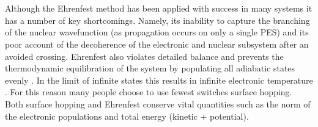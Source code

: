 \\\\
Although the Ehrenfest method has been applied with success in many systems \cite{Li2005Aug, Saita2012Dec, Kohen1998Sep} it has a number of key shortcomings. Namely, its inability to capture the branching of the nuclear wavefunction (as propagation occurs on only a single PES) and its poor account of the decoherence of the electronic and nuclear subsystem after an avoided crossing. Ehrenfest also violates detailed balance and prevents the thermodynamic equilibration of the system by populating all adiabatic states evenly \cite{tully_perspective:_2012, john_c._tully_nonadiabatic_nodate}. In the limit of infinite states this results in infinite electronic temperature \cite{parandekar_detailed_2006}. For this reason many people choose to use fewest switches surface hopping. Both surface hopping and Ehrenfest conserve vital quantities such as the norm of the electronic populations and total energy (kinetic + potential).

